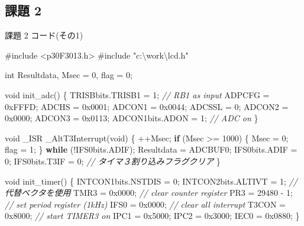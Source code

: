 \documentclass[9pt,a4paper,]{ltjsarticle}
\newenvironment{Shaded}{}{}
\newcommand{\BaseNTok}[1]{\textcolor[rgb]{0.25,0.63,0.44}{#1}}
\newcommand{\CommentTok}[1]{\textcolor[rgb]{0.38,0.63,0.69}{\textit{#1}}}
\newcommand{\ControlFlowTok}[1]{\textcolor[rgb]{0.00,0.44,0.13}{\textbf{#1}}}
\newcommand{\DataTypeTok}[1]{\textcolor[rgb]{0.56,0.13,0.00}{#1}}
\newcommand{\DecValTok}[1]{\textcolor[rgb]{0.25,0.63,0.44}{#1}}
\newcommand{\ImportTok}[1]{#1}
\newcommand{\NormalTok}[1]{#1}
\newcommand{\PreprocessorTok}[1]{\textcolor[rgb]{0.74,0.48,0.00}{#1}}
\begin{document}
\clearpage

\hypertarget{ux8ab2ux984c-2}{%
\subsection{課題 2}\label{ux8ab2ux984c-2}}

\begin{codelisting}

\caption{課題 2 コード(その1)}

\hypertarget{lst:awesome-code}{%
\label{lst:awesome-code}}%
\begin{Shaded}
\begin{Highlighting}[numbers=left,,]
\PreprocessorTok{#include }\ImportTok{<p30F3013.h>}
\PreprocessorTok{#include }\ImportTok{"c:\textbackslash{}work\textbackslash{}lcd.h"}

\DataTypeTok{int}\NormalTok{ Resultdata, Msec = }\DecValTok{0}\NormalTok{, flag = }\DecValTok{0}\NormalTok{;}

\DataTypeTok{void}\NormalTok{ init_adc() \{}
\NormalTok{  TRISBbits.TRISB1 = }\DecValTok{1}\NormalTok{;  }\CommentTok{// RB1 as input}
\NormalTok{  ADPCFG = }\BaseNTok{0xFFFD}\NormalTok{;}
\NormalTok{  ADCHS = }\BaseNTok{0x0001}\NormalTok{;}
\NormalTok{  ADCON1 = }\BaseNTok{0x0044}\NormalTok{;}
\NormalTok{  ADCSSL = }\DecValTok{0}\NormalTok{;}
\NormalTok{  ADCON2 = }\BaseNTok{0x0000}\NormalTok{;}
\NormalTok{  ADCON3 = }\BaseNTok{0x0113}\NormalTok{;}
\NormalTok{  ADCON1bits.ADON = }\DecValTok{1}\NormalTok{;  }\CommentTok{// ADC on}
\NormalTok{\}}

\DataTypeTok{void}\NormalTok{ _ISR _AltT3Interrupt(}\DataTypeTok{void}\NormalTok{) \{}
\NormalTok{  ++Msec;}
  \ControlFlowTok{if}\NormalTok{ (Msec >= }\DecValTok{1000}\NormalTok{) \{}
\NormalTok{    Msec = }\DecValTok{0}\NormalTok{;}
\NormalTok{    flag = }\DecValTok{1}\NormalTok{;}
\NormalTok{  \}}
  \ControlFlowTok{while}\NormalTok{ (!IFS0bits.ADIF);}
\NormalTok{  Resultdata = ADCBUF0;}
\NormalTok{  IFS0bits.ADIF = }\DecValTok{0}\NormalTok{;}
\NormalTok{  IFS0bits.T3IF = }\DecValTok{0}\NormalTok{;  }\CommentTok{// タイマ３割り込みフラグクリア}
\NormalTok{\}}

\DataTypeTok{void}\NormalTok{ init_timer() \{}
\NormalTok{  INTCON1bits.NSTDIS = }\DecValTok{0}\NormalTok{;}
\NormalTok{  INTCON2bits.ALTIVT = }\DecValTok{1}\NormalTok{;  }\CommentTok{// 代替ベクタを使用}
\NormalTok{  TMR3 = }\BaseNTok{0x0000}\NormalTok{;           }\CommentTok{// clear counter register}
\NormalTok{  PR3 = }\DecValTok{29480}\NormalTok{ - }\DecValTok{1}\NormalTok{;         }\CommentTok{// set period register (1kHz)}
\NormalTok{  IFS0 = }\BaseNTok{0x0000}\NormalTok{;           }\CommentTok{// clear all interrupt}
\NormalTok{  T3CON = }\BaseNTok{0x8000}\NormalTok{;          }\CommentTok{// start TIMER3 on}
\NormalTok{  IPC1 = }\BaseNTok{0x5000}\NormalTok{;}
\NormalTok{  IPC2 = }\BaseNTok{0x3000}\NormalTok{;}
\NormalTok{  IEC0 = }\BaseNTok{0x0880}\NormalTok{;}
\NormalTok{\}}
\end{Highlighting}
\end{Shaded}

\end{codelisting}
\end{document}
